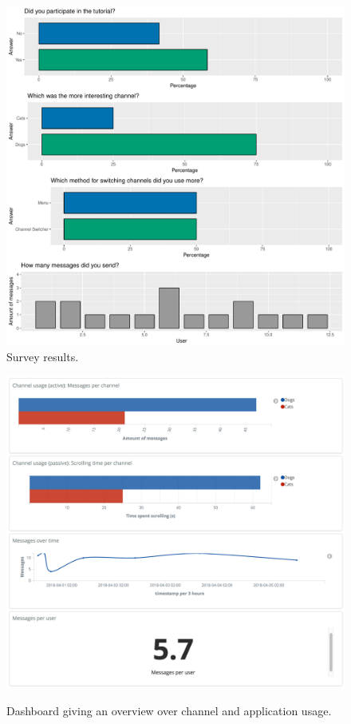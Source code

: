 \begin{figure}[htb]
        \includegraphics[width=.75\paperwidth]{gfx/survey.pdf}
        \caption{Survey results.}
        \label{figure:evaluation:user:survey-report}
\end{figure}

\begin{figure}[htb]
        \caption{Dashboard giving an overview over channel and application usage.}
        \includegraphics[width=1.1\textwidth]{gfx/dashboard-usage.png}
        \label{figure:evaluation:user:dashboard-channels}
\end{figure}

